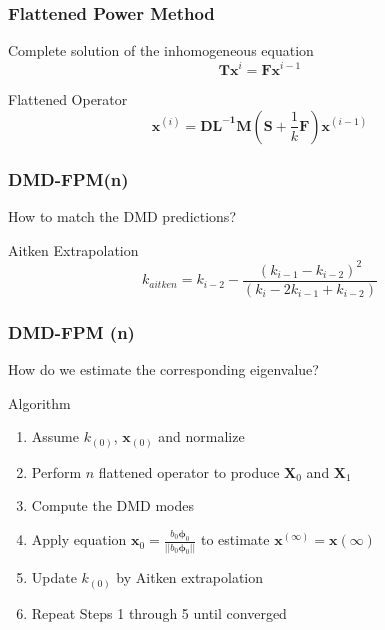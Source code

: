 \documentclass[fleqn]{beamer}
\renewcommand{\vec}[1]{\bm{#1}} %
\begin{document}
\begin{frame}
\frametitle{Flattened Power Method}
\begin{block}{Complete solution of the inhomogeneous equation}
\vspace*{-\baselineskip}\setlength\belowdisplayshortskip{0pt}
\begin{equation*}
    \mathbf{Tx}^{i} = \mathbf{Fx}^{i-1}
\end{equation*}
\end{block}
\begin{block}{Flattened Operator\footnotemark}
\vspace*{-\baselineskip}\setlength\belowdisplayshortskip{0pt}
\begin{equation*}
 \mathbf{x}^{(i)} =  \mathbf{DL^{-1}M} (\mathbf{S} + \frac{1}{k} \mathbf{F})\mathbf{x}^{(i-1)}   
 \label{eq:flatten}
\end{equation*}
\end{block}
\end{frame}  

\begin{frame}
\frametitle{DMD-FPM(n)}
How to match the DMD predictions?
\begin{block}{Aitken Extrapolation\footnotemark }
\vspace*{-\baselineskip}\setlength\belowdisplayshortskip{0pt}
\begin{equation*}
k_{aitken} = k_{i-2} - \frac{(k_{i-1}-k_{i-2})^2}{(k_i - 2k_{i-1} + k_{i-2})}
\end{equation*}
\end{block}
\end{frame}

\begin{frame}
\frametitle{DMD-FPM (n)}
How do we estimate the corresponding eigenvalue?
\begin{block}{Algorithm\footnotemark}
\begin{enumerate}
 \item Assume $k_{(0)}$, $\mathbf{x}_{(0)}$ and normalize
 \item Perform $n$ flattened operator to produce $\mathbf{X}_0$ and $\mathbf{X}_1$
 \item Compute the DMD modes
 \item Apply equation $\mathbf{x}_{0}=\frac{b_0 \vec{\phi}^{}_0}{ ||b_0 \vec{\phi}^{}_0||}$ to estimate $\mathbf{x}^{(\infty)}=\mathbf{x}(\infty)$
 \item Update $k_{(0)}$ by Aitken extrapolation
 \item Repeat Steps 1 through 5 until converged
\end{enumerate}
\end{block}
\end{frame}   
\end{document}
